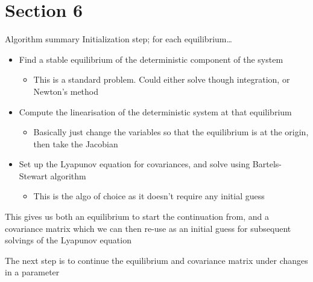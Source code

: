 \documentclass[presentation]{beamer}
\begin{document}
\section{Section 6}
\label{sec:org91f915d}
\begin{frame}[label={sec:org2e4b7d3},plain]{Algorithm summary}
Initialization step; for each equilibrium\ldots{}
\vfill
\begin{itemize}
\item Find a stable equilibrium of the deterministic component of the system
\begin{itemize}
\item This is a standard problem. Could either solve though integration, or Newton's method
\end{itemize}
\end{itemize}
\vfill
\begin{itemize}
\item Compute the linearisation of the deterministic system at that equilibrium
\begin{itemize}
\item Basically just change the variables so that the equilibrium is at the origin, then take the Jacobian
\end{itemize}
\end{itemize}
\vfill
\begin{itemize}
\item Set up the Lyapunov equation for covariances, and solve using Bartels-Stewart algorithm
\begin{itemize}
\item This is the algo of choice as it doesn't require any initial guess
\end{itemize}
\end{itemize}


\vfill
This gives us both an equilibrium to start the continuation from, and a covariance matrix which we can then re-use as an initial guess for subsequent solvings of the Lyapunov equation

The next step is to continue the equilibrium and covariance matrix under changes in a parameter
\end{frame}
\end{document}
